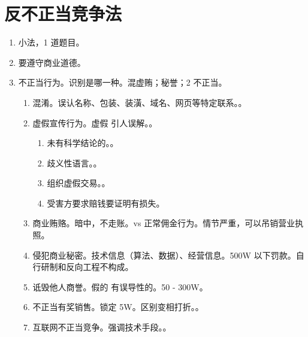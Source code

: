 \section{反不正当竞争法}
\begin{enumerate}
  \item 小法，1 道题目。
  \item 要遵守商业道德。
  \item 不正当行为。识别是哪一种。混虚贿；秘誉；2 不正当。
        \begin{enumerate}
          \item 混淆。误认名称、包装、装潢、域名、网页等特定联系。。
          \item 虚假宣传行为。虚假 \hz 引人误解。。
                \begin{enumerate}
                  \item 未有科学结论的。。
                  \item 歧义性语言。。
                  \item 组织虚假交易。。
                  \item 受害方要求赔钱要证明有损失。
                \end{enumerate}
          \item 商业贿赂。暗中，不走账。vs 正常佣金行为。\sjt 情节严重，可以吊销营业执照。
          \item 侵犯商业秘密。技术信息（算法、数据）、经营信息。500W 以下罚款。自行研制和反向工程不构成。
          \item 诋毁他人商誉。假的 \hz 有误导性的。50 - 300W。
          \item 不正当有奖销售。锁定 5W。区别变相打折。。
          \item 互联网不正当竞争。强调技术手段。。
        \end{enumerate}
\end{enumerate}
